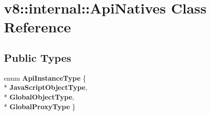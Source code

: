 \hypertarget{classv8_1_1internal_1_1_api_natives}{}\section{v8\+:\+:internal\+:\+:Api\+Natives Class Reference}
\label{classv8_1_1internal_1_1_api_natives}
\subsection*{Public Types}
\begin{DoxyCompactItemize}
\item 
enum {\bfseries Api\+Instance\+Type} \{ \\*
{\bfseries Java\+Script\+Object\+Type}, 
\\*
{\bfseries Global\+Object\+Type}, 
\\*
{\bfseries Global\+Proxy\+Type}
 \}\hypertarget{classv8_1_1internal_1_1_api_natives_aa8eeaaed51f9aa1ff3d25fbf81ba178b}{}\label{classv8_1_1internal_1_1_api_natives_aa8eeaaed51f9aa1ff3d25fbf81ba178b}

\end{DoxyCompactItemize}
